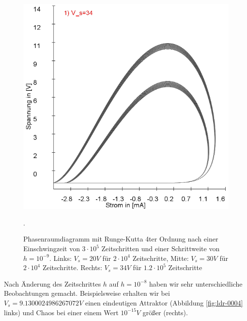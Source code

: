 \documentclass[12pt,a4paper]{article}
\begin{document}
\begin{figure}[!htbp]
\includegraphics[scale=0.28]{schwing-runge-nach300k-weitere120k-10-9-34V}
\caption{Phasenraumdiagramm mit Runge-Kutta 4ter Ordnung nach einer Einschwingzeit von  $3\cdot10^5$ Zeitschritten und einer Schrittweite von $h=10^{-9}$. Links: $V_s=20V$ für $2\cdot10^4$ Zeitschritte, Mitte: $V_s=30V$ für $2\cdot10^4$ Zeitschritte. Rechts: $V_s=34V$ für $1.2\cdot10^5$ Zeitschritte}. 
\label{fig:ldr-0003}
\end{figure}
\newline
Nach Änderung des Zeitschrittes $h$ auf $h=10^{-8}$ haben wir sehr unterschiedliche Beobachtungen gemacht. Beispielsweise erhalten wir bei $V_s=9.1300024986267072V$ einen eindeutigen Attraktor (Abbildung \ref{fig:ldr-0004} links) und Chaos bei einer einem Wert $10^{-15}V$ größer (rechts).
\end{document}
